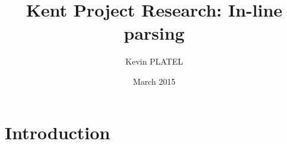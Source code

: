\documentclass{article}
\title{Kent Project Research: In-line parsing}
\author{Kevin PLATEL}
\date{March 2015}
\begin{document}
\maketitle

\section{Introduction}

\nocite{*}


\end{document}
